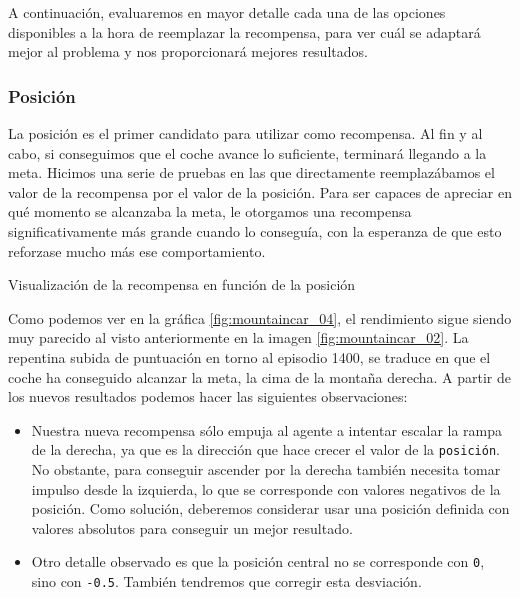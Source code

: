 A continuación, evaluaremos en mayor detalle cada una de las opciones disponibles a la hora de reemplazar la recompensa, para ver cuál se adaptará mejor al problema y nos proporcionará mejores resultados.


\subsubsection*{Posición}

La posición es el primer candidato para utilizar como recompensa. Al fin y al cabo, si conseguimos que el coche avance lo suficiente, terminará llegando a la meta. Hicimos una serie de pruebas en las que directamente reemplazábamos el valor de la recompensa por el valor de la posición. Para ser capaces de apreciar en qué momento se alcanzaba la meta, le otorgamos una recompensa significativamente más grande cuando lo conseguía, con la esperanza de que esto reforzase mucho más ese comportamiento.

%
       {Visualización de la recompensa en función de la posición}

Como podemos ver en la gráfica \ref{fig:mountaincar_04}, el rendimiento sigue siendo muy parecido al visto anteriormente en la imagen \ref{fig:mountaincar_02}. La repentina subida de puntuación en torno al episodio 1400, se traduce en que el coche ha conseguido alcanzar la meta, la cima de la montaña derecha. A partir de los nuevos resultados podemos hacer las siguientes observaciones:

\begin{itemize}
    \item Nuestra nueva recompensa sólo empuja al agente a intentar escalar la rampa de la derecha, ya que es la dirección que hace crecer el valor de la \texttt{posición}. No obstante, para conseguir ascender por la derecha también necesita tomar impulso desde la izquierda, lo que se corresponde con valores negativos de la posición. Como solución, deberemos considerar usar una posición definida con valores absolutos para conseguir un mejor resultado.
    \item Otro detalle observado es que la posición central no se corresponde con \texttt{0}, sino con \texttt{-0.5}. También tendremos que corregir esta desviación.
\end{itemize}

